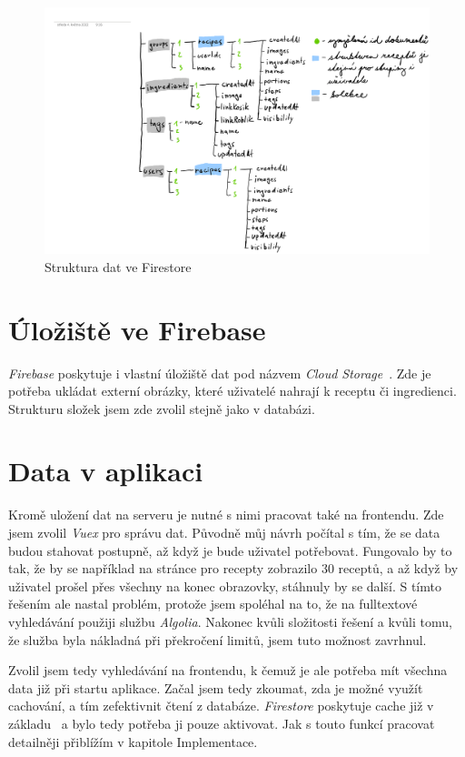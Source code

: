 \begin{figure}[H]
    \includegraphics[width=\textwidth]{pdf/navrh-firestore}
    \caption{Struktura dat ve Firestore} \label{picture:recipeo:firestore-structure}
\end{figure}

\section{Úložiště ve Firebase}
\emph{Firebase} poskytuje i vlastní úložiště dat pod názvem \emph{Cloud Storage}~\cite{CloudStorage}. Zde je potřeba ukládat externí obrázky, které uživatelé
nahrají k receptu či ingredienci. Strukturu složek jsem zde zvolil stejně jako v databázi.

\section{Data v aplikaci}
Kromě uložení dat na serveru je nutné s nimi pracovat také na frontendu. Zde jsem zvolil \emph{Vuex} pro správu dat. Původně
můj návrh počítal s tím, že se data budou stahovat postupně, až když je bude uživatel potřebovat. Fungovalo by to tak, že by
se například na stránce pro recepty zobrazilo 30 receptů, a až když by uživatel prošel přes všechny na konec obrazovky, stáhnuly
by se další. S tímto řešením ale nastal problém, protože jsem spoléhal na to, že na fulltextové vyhledávání použiji službu
\emph{Algolia}. Nakonec kvůli složitosti řešení a kvůli tomu, že služba byla nákladná při překročení limitů, jsem tuto možnost zavrhnul.

Zvolil jsem tedy vyhledávání na frontendu, k čemuž je ale potřeba mít všechna data již při startu aplikace. Začal jsem tedy
zkoumat, zda je možné využít cachování, a tím zefektivnit čtení z databáze. \emph{Firestore} poskytuje cache již v základu~\cite{FirestoreCache} a bylo
tedy potřeba ji pouze aktivovat. Jak s touto funkcí pracovat detailněji přiblížím v kapitole Implementace.

